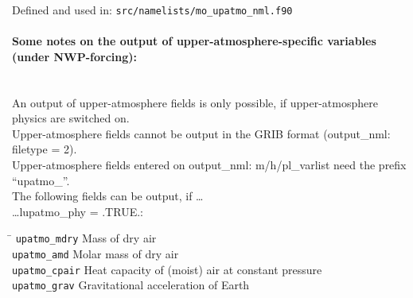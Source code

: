 \begin{longtab}
\end{longtab}

Defined and used in: \verb+src/namelists/mo_upatmo_nml.f90+

\paragraph{Some notes on the output of upper-atmosphere-specific variables (under NWP-forcing):}
\mbox{}\\
An output of upper-atmosphere fields is only possible, 
if upper-atmosphere physics are switched on. \\
Upper-atmosphere fields cannot be output in the GRIB format 
(output\_nml: filetype = 2). \\
Upper-atmosphere fields entered on output\_nml: m/h/pl\_varlist 
need the prefix ``upatmo\_''. \\

The following fields can be output, if \ldots \\

\ldots lupatmo\_phy = .TRUE.:
\begin{tabbing}
\hspace*{0.4\textwidth} \= \kill
\texttt{upatmo\_mdry}      \>  Mass of dry air \\
\texttt{upatmo\_amd}       \>  Molar mass of dry air \\
\texttt{upatmo\_cpair}     \>  Heat capacity of (moist) air at constant pressure \\
\texttt{upatmo\_grav}      \>  Gravitational acceleration of Earth 
\end{tabbing}

